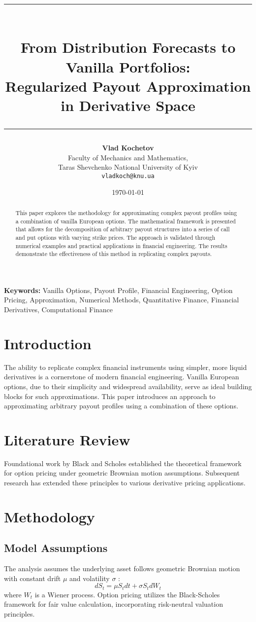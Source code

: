 \documentclass[12pt]{article}
\title{\rule{\textwidth}{4pt}\\
\textbf{From Distribution Forecasts to Vanilla Portfolios: \\[0.2cm]
Regularized Payout Approximation in Derivative Space}\\[0.2cm]
\rule{\textwidth}{2pt}}
\author{\small \textbf{Vlad Kochetov} \\
    \small Faculty of Mechanics and Mathematics, \\
    \small Taras Shevchenko National University of Kyiv \\
    \small \texttt{vladkoch@knu.ua}
}
\date{\today}
\providecommand{\keywords}[1]{\textbf{Keywords:} #1}
\begin{document}
\maketitle

\begin{abstract}
This paper explores the methodology for approximating complex payout profiles using a
combination of vanilla European options. The mathematical framework is presented that
allows for the decomposition of arbitrary payout structures into a series of call and
put options with varying strike prices. The approach is validated through numerical
examples and practical applications in financial engineering. The results demonstrate
the effectiveness of this method in replicating complex payouts.
\end{abstract}

\newpage

\keywords{
    \small{
        Vanilla Options, 
        Payout Profile, 
        Financial Engineering, 
        Option Pricing, 
        Approximation, 
        Numerical Methods,
        Quantitative Finance,
        Financial Derivatives,
        Computational Finance
    }
}

\section{Introduction}
The ability to replicate complex financial instruments using simpler, more liquid
derivatives is a cornerstone of modern financial engineering. Vanilla European options,
due to their simplicity and widespread availability, serve as ideal building blocks
for such approximations. This paper introduces an approach to approximating arbitrary
payout profiles using a combination of these options.

\section{Literature Review}
Foundational work by Black and Scholes \cite{black1973pricing} established the theoretical framework for option pricing under geometric Brownian motion assumptions. Subsequent research has extended these principles to various derivative pricing applications.

\section{Methodology}
\subsection{Model Assumptions}
The analysis assumes the underlying asset follows geometric Brownian motion with constant drift $\mu$ and volatility $\sigma$ \cite{black1973pricing}:
\begin{equation}
dS_t = \mu S_t dt + \sigma S_t dW_t
\end{equation}
where $W_t$ is a Wiener process. Option pricing utilizes the Black-Scholes framework \cite{black1973pricing} for fair value calculation, incorporating risk-neutral valuation principles.
\end{document}
